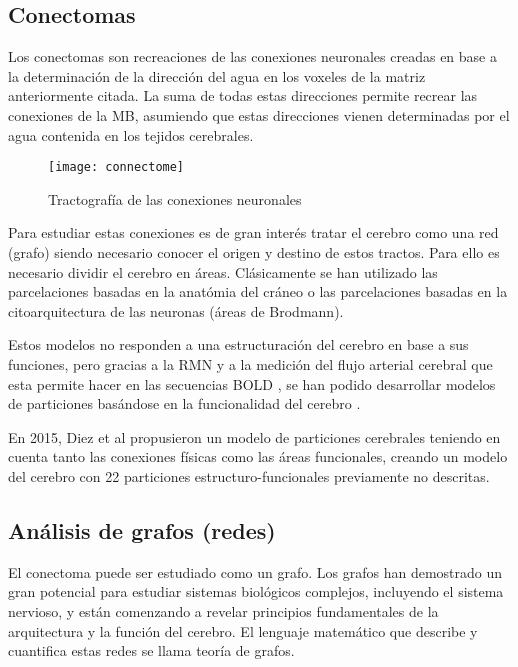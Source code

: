 \documentclass[fleqn,10pt]{UICArticle} %
\begin{document}
\subsection{Conectomas}
Los conectomas son recreaciones de las conexiones neuronales creadas en base a la determinación de la dirección del agua en los voxeles de la matriz anteriormente citada. La suma de todas estas direcciones permite recrear las conexiones de la MB, asumiendo que estas direcciones vienen determinadas por el agua contenida en los tejidos cerebrales.

\begin{figure}[ht]
	\centering
	\texttt{[image: connectome]}
	\caption{Tractografía de las conexiones neuronales}
	\label{fig:connectome}
\end{figure}

Para estudiar estas conexiones es de gran interés tratar el cerebro como una red (grafo) siendo necesario conocer el origen y destino de estos tractos. Para ello es necesario dividir el cerebro en áreas. Clásicamente se han utilizado las parcelaciones basadas en la anatómia del cráneo o las parcelaciones basadas en la citoarquitectura de las neuronas (áreas de Brodmann).

Estos modelos no responden a una estructuración del cerebro en base a sus funciones, pero gracias a la RMN y a la medición del flujo arterial cerebral que esta permite hacer en las secuencias BOLD \cite{Ogawa1990}, se han podido desarrollar modelos de particiones basándose en la funcionalidad del cerebro \cite{Heller2006}.

En 2015, Diez et al \cite{Diez2015} propusieron un modelo de particiones cerebrales teniendo en cuenta tanto las conexiones físicas como las áreas funcionales, creando un modelo del cerebro con 22 particiones estructuro-funcionales previamente no descritas.



\subsection{Análisis de grafos (redes)}


 El conectoma puede ser estudiado como un grafo. Los grafos han demostrado un gran potencial para estudiar sistemas biológicos complejos, incluyendo el sistema nervioso, y están comenzando a revelar principios fundamentales de la arquitectura y la función del cerebro. El lenguaje matemático que describe y cuantifica estas redes se llama teoría de grafos.
 
\end{document}
